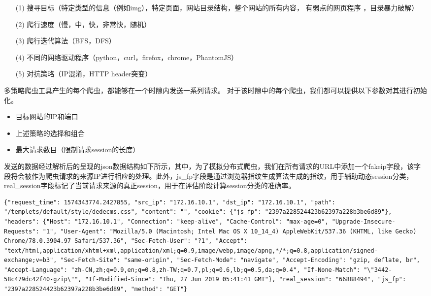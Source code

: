 \documentclass[doctor,privacy,twoside]{buaa_mac}
\begin{document}
\begin{itemize}
\item[(1)] 搜寻目标（特定类型的信息（例如img），特定页面，网站目录结构，整个网站的所有内容， 有弱点的网页程序 ，目录暴力破解）
\item[(2)] 爬行速度（慢，中，快，非常快，随机）
\item[(3)] 爬行迭代算法（BFS，DFS）
\item[(4)] 不同的网络驱动程序（python，curl，firefox，chrome，PhantomJS）
\item[(5)] 对抗策略（IP混淆，HTTP header突变）
\end {itemize}

多策略爬虫工具产生的每个爬虫，都能够在一个时隙内发送一系列请求。 对于该时隙中的每个爬虫，我们都可以提供以下参数对其进行初始化。

\begin{itemize}
\item 目标网站的IP和端口
\item 上述策略的选择和组合
\item 最大请求数目（限制请求session的长度）
\end {itemize}

发送的数据经过解析后的呈现的json数据结构如下所示，其中，为了模拟分布式爬虫，我们在所有请求的URL中添加一个fakeip字段，该字段将会被作为爬虫请求的来源IP进行相应的处理。此外，js\_{}fp字段是通过浏览器指纹生成算法生成的指纹，用于辅助动态session分类，real\_{}session字段标记了当前请求来源的真正session，用于在评估阶段计算session分类的准确率。
\centerline{}
\lstset{language=JavaScript}
\begin{lstlisting}
{"request_time": 1574343774.2427855, "src_ip": "172.16.10.1", "dst_ip": "172.16.10.1", "path": "/templets/default/style/dedecms.css", "content": "", "cookie": {"js_fp": "2397a228524423b62397a228b3be6d89"}, "headers": {"Host": "172.16.10.1", "Connection": "keep-alive", "Cache-Control": "max-age=0", "Upgrade-Insecure-Requests": "1", "User-Agent": "Mozilla/5.0 (Macintosh; Intel Mac OS X 10_14_4) AppleWebKit/537.36 (KHTML, like Gecko) Chrome/78.0.3904.97 Safari/537.36", "Sec-Fetch-User": "?1", "Accept": "text/html,application/xhtml+xml,application/xml;q=0.9,image/webp,image/apng,*/*;q=0.8,application/signed-exchange;v=b3", "Sec-Fetch-Site": "same-origin", "Sec-Fetch-Mode": "navigate", "Accept-Encoding": "gzip, deflate, br", "Accept-Language": "zh-CN,zh;q=0.9,en;q=0.8,zh-TW;q=0.7,pl;q=0.6,lb;q=0.5,da;q=0.4", "If-None-Match": "\"3442-58c479dc42f40-gzip\"", "If-Modified-Since": "Thu, 27 Jun 2019 05:41:41 GMT"}, "real_session": "66888494", "js_fp": "2397a228524423b62397a228b3be6d89", "method": "GET"}
\end{lstlisting}
\end{document}
